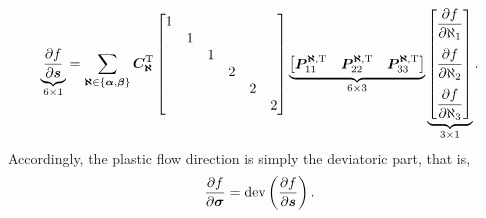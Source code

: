 \begin{gather}
    \underbrace{\dfrac{\partial{f}}{\partial{\bm{s}}}}_{6\times1}=\sum_{\bm{\aleph}\in\{\bm{\alpha},\bm{\beta}\}}\bm{C}_{\bm{\aleph}}^{\mathrm{T}}\begin{bmatrix}
        1 &   &   &   &   &   \\
          & 1 &   &   &   &   \\
          &   & 1 &   &   &   \\
          &   &   & 2 &   &   \\
          &   &   &   & 2 &   \\
          &   &   &   &   & 2
    \end{bmatrix}\underbrace{\begin{bmatrix}
            \bm{P}_{11}^{\bm{\aleph},\mathrm{T}} & \bm{P}_{22}^{\bm{\aleph},\mathrm{T}} & \bm{P}_{33}^{\bm{\aleph},\mathrm{T}}
        \end{bmatrix}}_{6\times3}\underbrace{\begin{bmatrix}
            \dfrac{\partial{f}}{\partial{\aleph_1}} \\[4mm] \dfrac{\partial{f}}{\partial{\aleph_2}} \\[4mm] \dfrac{\partial{f}}{\partial{\aleph_3}}
        \end{bmatrix}}_{3\times1}.
\end{gather}
Accordingly, the plastic flow direction is simply the deviatoric part, that is,
\begin{gather}
    \dfrac{\partial{f}}{\partial{\bm{\sigma}}}=\text{dev}\left(\dfrac{\partial{f}}{\partial{\bm{s}}}\right).
\end{gather}

